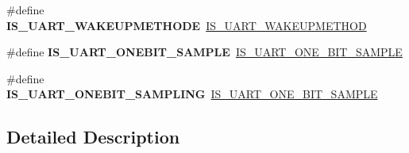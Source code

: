 \begin{DoxyCompactItemize}
\#define {\bfseries I\+S\+\_\+\+U\+A\+R\+T\+\_\+\+W\+A\+K\+E\+U\+P\+M\+E\+T\+H\+O\+DE}~\hyperlink{group___u_a_r_t___private___macros_ga144aecf3ad6ca3ce6653ae113c9a6141}{I\+S\+\_\+\+U\+A\+R\+T\+\_\+\+W\+A\+K\+E\+U\+P\+M\+E\+T\+H\+OD}
\item 
\mbox{\label{group___h_a_l___u_a_r_t___aliased___macros_ga5cc20fb4146a1269b5b8a81d5e4578fa}} 
\#define {\bfseries I\+S\+\_\+\+U\+A\+R\+T\+\_\+\+O\+N\+E\+B\+I\+T\+\_\+\+S\+A\+M\+P\+LE}~\hyperlink{group___u_a_r_t___private___macros_ga6452a4420dac4abd4f0ea0e1677f37a9}{I\+S\+\_\+\+U\+A\+R\+T\+\_\+\+O\+N\+E\+\_\+\+B\+I\+T\+\_\+\+S\+A\+M\+P\+LE}
\item 
\mbox{\label{group___h_a_l___u_a_r_t___aliased___macros_gae24c4fef26c5d50f9c8d27f0db203a5b}} 
\#define {\bfseries I\+S\+\_\+\+U\+A\+R\+T\+\_\+\+O\+N\+E\+B\+I\+T\+\_\+\+S\+A\+M\+P\+L\+I\+NG}~\hyperlink{group___u_a_r_t___private___macros_ga6452a4420dac4abd4f0ea0e1677f37a9}{I\+S\+\_\+\+U\+A\+R\+T\+\_\+\+O\+N\+E\+\_\+\+B\+I\+T\+\_\+\+S\+A\+M\+P\+LE}
\end{DoxyCompactItemize}


\subsection{Detailed Description}
